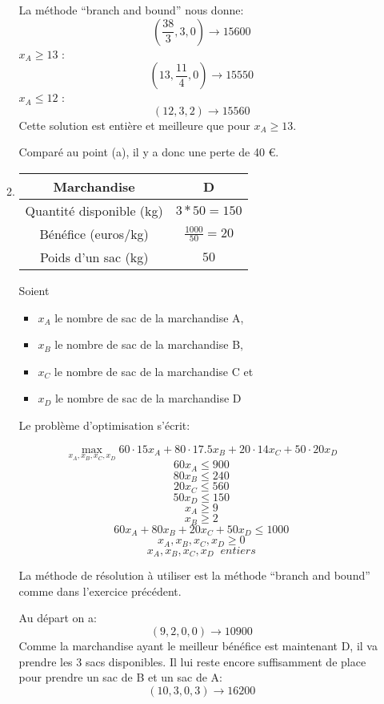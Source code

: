\begin{enumerate}
\begin{solution}
\begin{enumerate}
          La méthode ``branch and bound'' nous donne:
          $$(\frac{38}{3}, 3, 0) \longrightarrow 15600$$
          $x_A \geq 13$ :
          $$(13, \frac{11}{4}, 0) \longrightarrow 15550$$
          $x_A \leq 12$ :
          $$(12, 3, 2) \longrightarrow 15560$$
          Cette solution est entière et meilleure que pour $x_A \geq 13$.

          Comparé au point (a), il y a donc une perte de 40 \euro.
        \item
          \begin{center}
            \begin{tabular}{|c|c|}
              \hline
              Marchandise & D \\
              \hline
              Quantité disponible (kg) & $3*50 = 150$ \\
              \hline
              Bénéfice (euros/kg) & $\frac{1000}{50} = 20$ \\
              \hline
              Poids d'un sac (kg) & $50$ \\
              \hline
            \end{tabular}
          \end{center}
          Soient
          \begin{itemize}
            \item $x_A$ le nombre de sac de la marchandise A,
            \item $x_B$ le nombre de sac de la marchandise B,
            \item $x_C$ le nombre de sac de la marchandise C et
            \item $x_D$ le nombre de sac de la marchandise D
          \end{itemize}
          Le problème d'optimisation s'écrit:
          \begin{large}
            $$ \max_{x_A,x_B,x_C,x_D}
            {60 \cdot 15x_A + 80\cdot17.5x_B + 20\cdot14x_C + 50\cdot20x_D}
            $$
            $$60x_A \leq 900$$
            $$80x_B \leq 240$$
            $$20x_C \leq 560$$
            $$50x_D \leq 150$$
            $$x_A \geq 9$$
            $$x_B \geq 2$$
            $$60x_A + 80x_B + 20x_C + 50x_D \leq 1000$$
            $$x_A, x_B, x_C, x_D \geq 0$$
            $$x_A, x_B, x_C, x_D \;\;entiers$$
          \end{large}
          La méthode de résolution à utiliser est la méthode ``branch and bound'' comme dans l'exercice précédent.

          Au départ on a:
          $$(9, 2, 0, 0) \longrightarrow 10900$$
          Comme la marchandise ayant le meilleur bénéfice est maintenant D, il va prendre les 3 sacs disponibles. Il lui reste encore suffisamment de place pour prendre un sac de B et un sac de A:
          $$(10, 3, 0, 3) \longrightarrow 16200$$
      \end{enumerate}
    \end{solution}

\end{enumerate}
